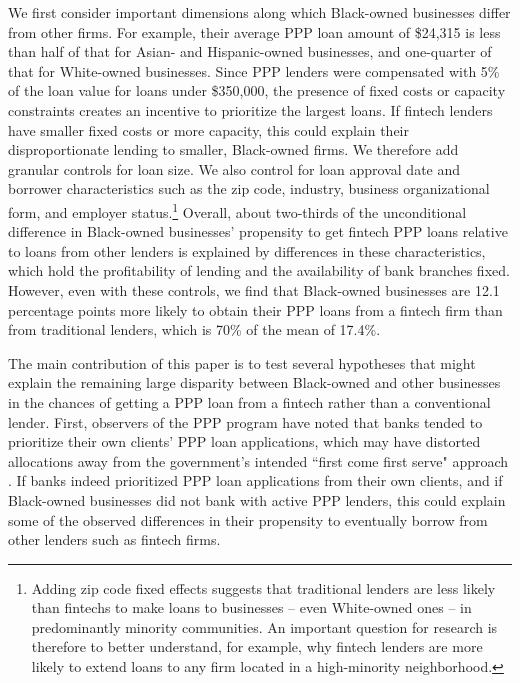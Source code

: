\documentclass[11pt]{article}
\begin{document}
We first consider important dimensions along which Black-owned businesses differ from other firms. For example, their average PPP loan amount of \$24,315 is less than half of that for Asian- and Hispanic-owned businesses, and one-quarter of that for White-owned businesses. Since PPP lenders were compensated with 5\% of the loan value for loans under \$350,000, the presence of fixed costs or capacity constraints creates an incentive to prioritize the largest loans. If fintech lenders have smaller fixed costs or more capacity, this could explain their disproportionate lending to smaller, Black-owned firms. We therefore add granular controls for loan size. We also control for loan approval date and borrower characteristics such as the zip code, industry, business organizational form, and employer status.\footnote{Adding zip code fixed effects suggests that traditional lenders are less likely than fintechs to make loans to businesses -- even White-owned ones -- in predominantly minority communities. An important question for research is therefore to better understand, for example, why fintech lenders are more likely to extend loans to any firm located in a high-minority neighborhood.} Overall, about two-thirds of the unconditional difference in Black-owned businesses' propensity to get fintech PPP loans relative to loans from other lenders is explained by differences in these characteristics, which hold the profitability of lending and the availability of bank branches fixed. However, even with these controls, we find that Black-owned businesses are 12.1 percentage points more likely to obtain their PPP loans from a fintech firm than from traditional lenders, which is 70\% of the mean of 17.4\%.

The main contribution of this paper is to test several hypotheses that might explain the remaining large disparity between Black-owned and other businesses in the chances of getting a PPP loan from a fintech rather than a conventional lender. First, observers of the PPP program have noted that banks tended to prioritize their own clients' PPP loan applications, which may have distorted allocations away from the government's intended ``first come first serve" approach  \citep{nytmin, li2020supplies}. If banks indeed prioritized PPP loan applications from their own clients, and if Black-owned businesses did not bank with active PPP lenders, this could explain some of the observed differences in their propensity to eventually borrow from other lenders such as fintech firms.  
\end{document}
